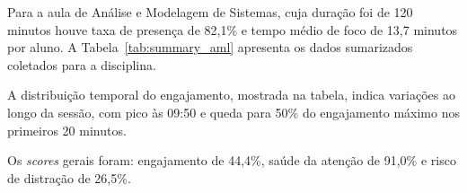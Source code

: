Para a aula de Análise e Modelagem de Sistemas, cuja duração foi de 120 minutos houve taxa de presença de 82,1\% e tempo médio de foco de 13,7 minutos por aluno. A Tabela~\ref{tab:summary_aml} apresenta os dados sumarizados coletados para a disciplina.



A distribuição temporal do engajamento, mostrada na tabela, indica variações ao longo da sessão, com pico às 09:50 e queda para 50\% do engajamento máximo nos primeiros 20 minutos.

Os \textit{scores} gerais foram: engajamento de 44,4\%, saúde da atenção de 91,0\% e risco de distração de 26,5\%.
